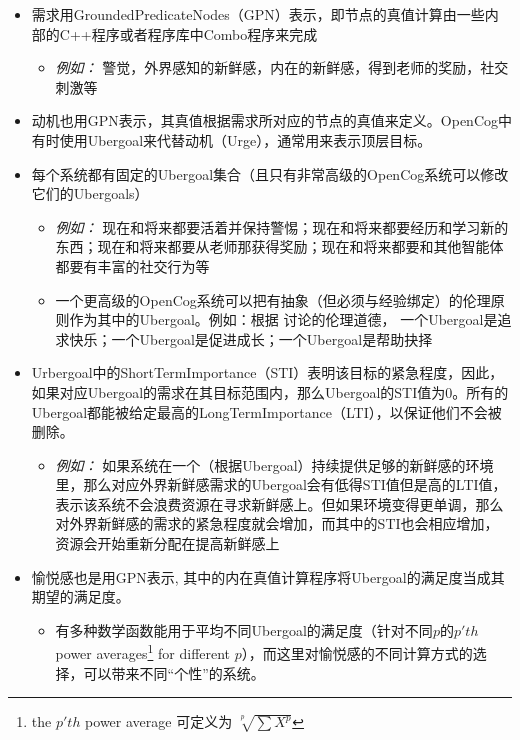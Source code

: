 \begin{itemize}

\item 需求用GroundedPredicateNodes（GPN）表示，即节点的真值计算由一些内部的C++程序或者程序库中Combo程序来完成

\begin{itemize}
\item {\it 例如：} 警觉，外界感知的新鲜感，内在的新鲜感，得到老师的奖励，社交刺激等
\end{itemize}

\item 动机也用GPN表示，其真值根据需求所对应的节点的真值来定义。OpenCog中有时使用Ubergoal来代替动机（Urge），通常用来表示顶层目标。

\item 每个系统都有固定的Ubergoal集合（且只有非常高级的OpenCog系统可以修改它们的Ubergoals）

\begin{itemize}
\item {\it 例如：} 现在和将来都要活着并保持警惕；现在和将来都要经历和学习新的东西；现在和将来都要从老师那获得奖励；现在和将来都要和其他智能体都要有丰富的社交行为等

\item  一个更高级的OpenCog系统可以把有抽象（但必须与经验绑定）的伦理原则作为其中的Ubergoal。例如：根据 \cite{GoertzelHP}讨论的伦理道德， 一个Ubergoal是追求快乐；一个Ubergoal是促进成长；一个Ubergoal是帮助抉择
\end{itemize}

\item Urbergoal中的ShortTermImportance（STI）表明该目标的紧急程度，因此，如果对应Ubergoal的需求在其目标范围内，那么Ubergoal的STI值为0。所有的Ubergoal都能被给定最高的LongTermImportance（LTI），以保证他们不会被删除。

\begin{itemize}
\item {\it 例如：} 如果系统在一个（根据Ubergoal）持续提供足够的新鲜感的环境里，那么对应外界新鲜感需求的Ubergoal会有低得STI值但是高的LTI值，表示该系统不会浪费资源在寻求新鲜感上。但如果环境变得更单调，那么对外界新鲜感的需求的紧急程度就会增加，而其中的STI也会相应增加，资源会开始重新分配在提高新鲜感上

\end{itemize}

\item 愉悦感也是用GPN表示, 其中的内在真值计算程序将Ubergoal的满足度当成其期望的满足度。

\begin{itemize}
\item 有多种数学函数能用于平均不同Ubergoal的满足度（针对不同$p$的$p'th$ power averages\footnote{the $p'th$ power average 可定义为 $\sqrt[p]{\sum X^p}$} for different $p$），而这里对愉悦感的不同计算方式的选择，可以带来不同“个性”的系统。


\end{itemize}
\end{itemize}
